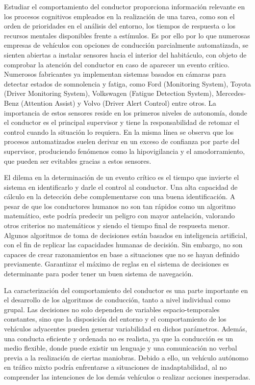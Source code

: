 Estudiar el comportamiento del conductor proporciona información relevante en los procesos cognitivos empleados en la realización de una tarea, como son el orden de prioridades en el análisis del entorno, los tiempos de respuesta o los recursos mentales disponibles frente a estímulos. Es por ello por lo que numerosas empresas de vehículos con opciones de conducción parcialmente automatizada, se sienten abiertas a instalar sensores hacia el interior del habitáculo, con objeto de comprobar la atención del conductor en caso de aparecer un evento crítico. Numerosos fabricantes ya implementan sistemas basados en cámaras para detectar estados de somnolencia y fatiga, como Ford (Monitoring System), Toyota (Driver Monitoring System), Volkswagen (Fatigue Detection System), Mercedes-Benz (Attention Assist) y Volvo (Driver Alert Control) entre otros. La importancia de estos sensores reside en los primeros niveles de autonomía, donde el conductor es el principal supervisor y tiene la responsabilidad de retomar el control cuando la situación lo requiera. En la misma línea se observa que los procesos automatizados suelen derivar en un exceso de confianza por parte del supervisor, produciendo fenómenos como la hipovigilancia y el amodorramiento, que pueden ser evitables gracias a estos sensores. 

El dilema en la determinación de un evento crítico es el tiempo que invierte el sistema en identificarlo y darle el control al conductor. Una alta capacidad de cálculo en la detección debe complementarse con una buena identificación. A pesar de que los conductores humanos no son tan rápidos como un algoritmo matemático, este podría predecir un peligro con mayor antelación, valorando otros criterios no matemáticos y siendo el tiempo final de respuesta menor. Algunos algoritmos de toma de decisiones están basados en inteligencia artificial, con el fin de replicar las capacidades humanas de decisión. Sin embargo, no son capaces de crear razonamientos en base a situaciones que no se hayan definido previamente. Garantizar el máximo de reglas en el sistema de decisiones es determinante para poder tener un buen sistema de navegación.  

La caracterización del comportamiento del conductor es una parte importante en el desarrollo de los algoritmos de conducción, tanto a nivel individual como grupal. Las decisiones no solo dependen de variables espacio-temporales constantes, sino que la disposición del entorno y el comportamiento de los vehículos adyacentes pueden generar variabilidad en dichos parámetros. Además, una conducta eficiente y ordenada no es realista, ya que la conducción es un medio flexible, donde puede existir un lenguaje y una comunicación no verbal previa a la realización de ciertas maniobras. Debido a ello, un vehículo autónomo en tráfico mixto podría enfrentarse a situaciones de inadaptabilidad, al no comprender las intenciones de los demás vehículos o realizar acciones inesperadas. 

